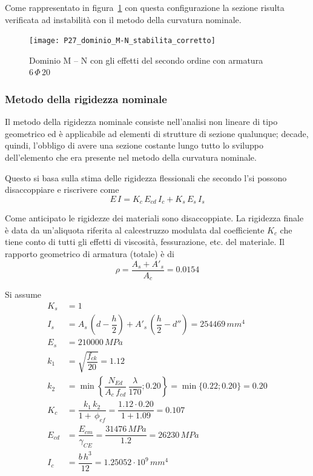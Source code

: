 Come rappresentato in figura~\ref{fig:P27_dominio_M-N_stabilita_corretto} con questa configurazione la sezione risulta verificata ad instabilità con il metodo della curvatura nominale.

\begin{figure}
	\centering
	\texttt{[image: P27\_dominio\_M-N\_stabilita\_corretto]}
	\caption{Dominio M -- N con gli effetti del secondo ordine con armatura $6\,\Phi\,20$}
	\label{fig:P27_dominio_M-N_stabilita_corretto}
\end{figure}

\subsubsection{Metodo della rigidezza nominale}
Il metodo della rigidezza nominale consiste nell'analisi non lineare di tipo geometrico ed è applicabile ad elementi di strutture di sezione qualunque; decade, quindi, l'obbligo di avere una sezione costante lungo tutto lo sviluppo dell'elemento che era presente nel metodo della curvatura nominale. 

Questo si basa sulla stima delle rigidezza flessionali che secondo l'\ec si possono disaccoppiare e riscrivere come
\begin{equation}
    \label{eq:EI_eurocode}
	E\,I = K_c\,E_{cd}\,I_c + K_s\,E_s\,I_s
\end{equation}

Come anticipato le rigidezze dei materiali sono disaccoppiate. La rigidezza finale è data da un'aliquota riferita al calcestruzzo modulata dal coefficiente $K_c$ che tiene conto di tutti gli effetti di viscosità, fessurazione, etc. del materiale. Il rapporto geometrico di armatura (totale) è di
\[
\rho = \dfrac{A_s + A'_s}{A_c} = 0.0154
\]

Si assume
\begin{align*}
    K_s &= 1\\
	I_s &= A_s\,\left(d-\dfrac{h}{2}\right) + A'_s\,\left(\dfrac{h}{2}-d''\right) = 254469\,mm^4\\
	E_s &= 210000\,MPa\\
	k_1 &= \sqrt{\dfrac{f_{ck}}{20}} = 1.12\\
	k_2 &= \min\left\{\dfrac{N_{Ed}}{A_c\,f_{cd}}\,\dfrac{\lambda}{170}; 0.20\right\} = \min\{0.22; 0.20\} = 0.20\\ 
	K_c &= \dfrac{k_1\,k_2}{1+\,\phi_{ef}} = \dfrac{1.12\cdot0.20}{1+1.09} = 0.107\\
	E_{cd} &= \dfrac{E_{cm}}{\gamma_{CE}} = \dfrac{31476\,MPa}{1.2} = 26230\,MPa\\
	I_c &= \dfrac{b\,h^3}{12} = 1.25052\cdot 10^9\,mm^4\\
\end{align*}

